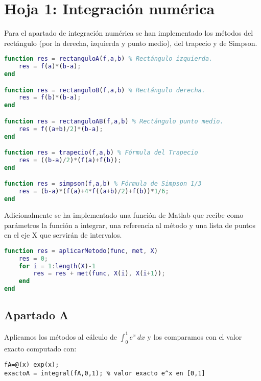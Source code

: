 \section{Hoja 1: Integración numérica}

Para el apartado de integración numérica se han implementado los métodos del rectángulo (por la derecha, izquierda y punto medio), del trapecio y de Simpson.

\begin{lstlisting}[language=Matlab, caption={Fórmulas de integración.},captionpos=b,texcl=true]
function res = rectanguloA(f,a,b) % Rectángulo izquierda.
    res = f(a)*(b-a);
end

function res = rectanguloB(f,a,b) % Rectángulo derecha.
    res = f(b)*(b-a);
end

function res = rectanguloAB(f,a,b) % Rectángulo punto medio.
    res = f((a+b)/2)*(b-a);
end

function res = trapecio(f,a,b) % Fórmula del Trapecio
    res = ((b-a)/2)*(f(a)+f(b));
end

function res = simpson(f,a,b) % Fórmula de Simpson 1/3 
    res = (b-a)*(f(a)+4*f((a+b)/2)+f(b))*1/6;
end
\end{lstlisting}

Adicionalmente se ha implementado una función de Matlab que recibe como parámetros la función a integrar, una referencia al método y una lista de puntos en el eje X que servirán de intervalos.

\begin{lstlisting}[language=Matlab, caption={Función que aplica el método de integración en los intervalos.},captionpos=b,texcl=true]
% Para aplicar diversos métodos en el apartado B
function res = aplicarMetodo(func, met, X)
    res = 0;
    for i = 1:length(X)-1
        res = res + met(func, X(i), X(i+1));
    end
end
\end{lstlisting}

\subsection{Apartado A}
Aplicamos los métodos al cálculo de \(\int_{0}^{1} e^x \,dx\) y los comparamos con el valor exacto computado con:
\begin{lstlisting}
fA=@(x) exp(x);
exactoA = integral(fA,0,1); % valor exacto e^x en [0,1]
\end{lstlisting}

